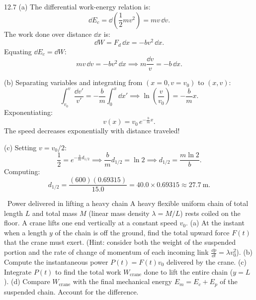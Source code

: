 \begin{solution}{12.7}
(a) The differential work-energy relation is:
\[
\dd E_c = \dd\left(\frac{1}{2}m v^2\right) = m v\,\dd v.
\]
The work done over distance $\dd x$ is:
\[
\dd W = F_d\,\dd x = -b v^2\,\dd x.
\]
Equating $\dd E_c = \dd W$:
\[
m v\,\dd v = -b v^2\,\dd x \implies m\frac{\dd v}{v} = -b\,\dd x.
\]

(b) Separating variables and integrating from $(x=0, v=v_0)$ to $(x, v)$:
\[
\int_{v_0}^v \frac{\dd v'}{v'} = -\frac{b}{m}\int_0^x \dd x' \implies \ln\left(\frac{v}{v_0}\right) = -\frac{b}{m}x.
\]
Exponentiating:
\[
\boxed{v(x) = v_0\,e^{-\frac{b}{m}x}.}
\]
The speed decreases exponentially with distance traveled!

(c) Setting $v = v_0/2$:
\[
\frac{1}{2} = e^{-\frac{b}{m}d_{1/2}} \implies \frac{b}{m}d_{1/2} = \ln 2 \implies \boxed{d_{1/2} = \frac{m\ln 2}{b}.}
\]
Computing:
\[
d_{1/2} = \frac{(600)(0.69315)}{15.0} = 40.0\times 0.69315 \approx \mathbf{27.7\ \mathrm{m}.}
\]
\end{solution}

\begin{exercise}{\mastery\ Power delivered in lifting a heavy chain}
A heavy flexible uniform chain of total length $L$ and total mass $M$ (linear mass density $\lambda = M/L$) rests coiled on the floor. A crane lifts one end vertically at a constant speed $v_0$.
(a) At the instant when a length $y$ of the chain is off the ground, find the total upward force $F(t)$ that the crane must exert.
(Hint: consider both the weight of the suspended portion and the rate of change of momentum of each incoming link $\frac{\dd p}{\dd t} = \lambda v_0^2$).
(b) Compute the instantaneous power $P(t) = F(t)v_0$ delivered by the crane.
(c) Integrate $P(t)$ to find the total work $W_{\text{crane}}$ done to lift the entire chain ($y = L$).
(d) Compare $W_{\text{crane}}$ with the final mechanical energy $E_{m} = E_c + E_p$ of the suspended chain. Account for the difference.
\end{exercise}

\begin{tabletworkspace}[6.5cm]
\end{tabletworkspace}

